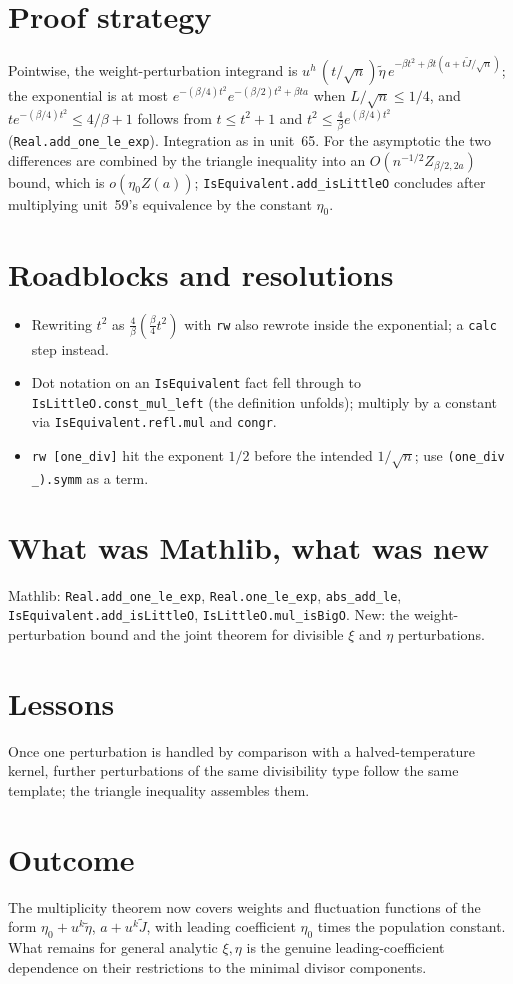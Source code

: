 \documentclass[11pt]{article}
\begin{document}
\section{Proof strategy}
Pointwise, the weight-perturbation integrand is $u^h\,(t/\sqrt n)\tilde\eta\,e^{-\beta t^2+\beta t(a+t\tilde J/\sqrt n)}$;
the exponential is at most $e^{-(\beta/4)t^2}e^{-(\beta/2)t^2+\beta ta}$ when $L/\sqrt n\le1/4$, and
$te^{-(\beta/4)t^2}\le4/\beta+1$ follows from $t\le t^2+1$ and $t^2\le\frac4\beta e^{(\beta/4)t^2}$
(\texttt{Real.add\_one\_le\_exp}). Integration as in unit~65. For the asymptotic the two differences
are combined by the triangle inequality into an $O(n^{-1/2}Z_{\beta/2,2a})$ bound, which is
$o(\eta_0Z(a))$; \texttt{IsEquivalent.add\_isLittleO} concludes after multiplying unit~59's
equivalence by the constant $\eta_0$.

\section{Roadblocks and resolutions}
\begin{itemize}
\item Rewriting $t^2$ as $\frac4\beta(\frac\beta4t^2)$ with \texttt{rw} also rewrote inside the
exponential; a \texttt{calc} step instead.
\item Dot notation on an \texttt{IsEquivalent} fact fell through to \texttt{IsLittleO.const\_mul\_left}
(the definition unfolds); multiply by a constant via \texttt{IsEquivalent.refl.mul} and \texttt{congr}.
\item \texttt{rw [one\_div]} hit the exponent $1/2$ before the intended $1/\sqrt n$; use
\texttt{(one\_div \_).symm} as a term.
\end{itemize}

\section{What was Mathlib, what was new}
Mathlib: \texttt{Real.add\_one\_le\_exp}, \texttt{Real.one\_le\_exp}, \texttt{abs\_add\_le},
\texttt{IsEquivalent.add\_isLittleO}, \texttt{IsLittleO.mul\_isBigO}. New: the weight-perturbation bound
and the joint theorem for divisible $\xi$ and $\eta$ perturbations.

\section{Lessons}
Once one perturbation is handled by comparison with a halved-temperature kernel, further perturbations
of the same divisibility type follow the same template; the triangle inequality assembles them.

\section{Outcome}
The multiplicity theorem now covers weights and fluctuation functions of the form
$\eta_0+u^k\tilde\eta$, $a+u^k\tilde J$, with leading coefficient $\eta_0$ times the population
constant. What remains for general analytic $\xi,\eta$ is the genuine leading-coefficient dependence
on their restrictions to the minimal divisor components.
\end{document}
